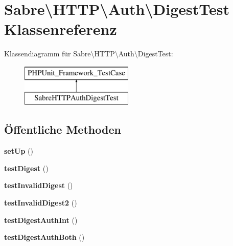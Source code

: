 \hypertarget{class_sabre_1_1_h_t_t_p_1_1_auth_1_1_digest_test}{}\section{Sabre\textbackslash{}H\+T\+TP\textbackslash{}Auth\textbackslash{}Digest\+Test Klassenreferenz}
\label{class_sabre_1_1_h_t_t_p_1_1_auth_1_1_digest_test}
Klassendiagramm für Sabre\textbackslash{}H\+T\+TP\textbackslash{}Auth\textbackslash{}Digest\+Test\+:\begin{figure}[H]
\begin{center}
\leavevmode
\includegraphics[height=2.000000cm]{class_sabre_1_1_h_t_t_p_1_1_auth_1_1_digest_test}
\end{center}
\end{figure}
\subsection*{Öffentliche Methoden}
\begin{DoxyCompactItemize}
\item 
\mbox{\label{class_sabre_1_1_h_t_t_p_1_1_auth_1_1_digest_test_a1b7c8595b31f1452d98a0cf8b70671b2}} 
{\bfseries set\+Up} ()
\item 
\mbox{\label{class_sabre_1_1_h_t_t_p_1_1_auth_1_1_digest_test_ac0f09518fecd79407fad62b79a20a148}} 
{\bfseries test\+Digest} ()
\item 
\mbox{\label{class_sabre_1_1_h_t_t_p_1_1_auth_1_1_digest_test_ab4363cbbc4a1935a4cd1dc3693660765}} 
{\bfseries test\+Invalid\+Digest} ()
\item 
\mbox{\label{class_sabre_1_1_h_t_t_p_1_1_auth_1_1_digest_test_a2972fd3cd95e043004be15d48d471ad3}} 
{\bfseries test\+Invalid\+Digest2} ()
\item 
\mbox{\label{class_sabre_1_1_h_t_t_p_1_1_auth_1_1_digest_test_a971fcb43a35b1d8a1fe360681d5373c2}} 
{\bfseries test\+Digest\+Auth\+Int} ()
\item 
\mbox{\label{class_sabre_1_1_h_t_t_p_1_1_auth_1_1_digest_test_a04b4e61dbaf55a283765bd3bdf63e9b2}} 
{\bfseries test\+Digest\+Auth\+Both} ()
\end{DoxyCompactItemize}
